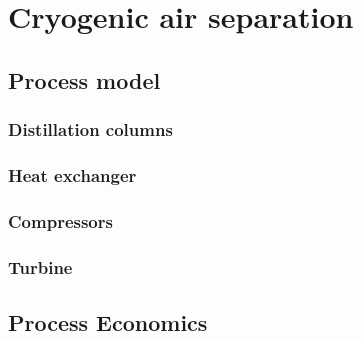\chapter{Cryogenic air separation}
\label{chp:cryo}

\section{Process model}
\label{sec:asu_model}

\subsection{Distillation columns}

\subsection{Heat exchanger}

\subsection{Compressors}

\subsection{Turbine}

\section{Process Economics}
\label{sec:uncertainty}

